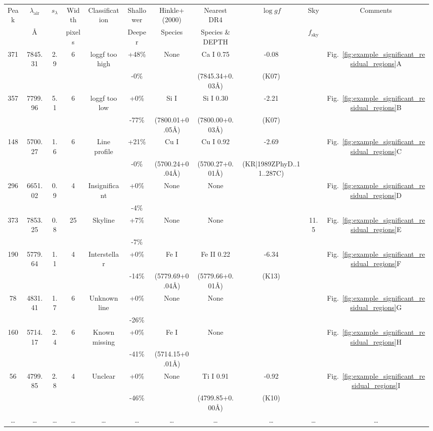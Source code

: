 \begin{tabular}{ccccccccccc}
\hline
Peak & $\lambda_\mathrm{air}$ & $s_\lambda$ & Width  & Classification & Shallower & Hinkle+(2000) & Nearest DR4 & $\log gf$ & Sky              & Comments \\
     & $\text{\AA}$           &             & pixels &                & Deeper    & Species       & Species \& \textsc{DEPTH} &  & $f_\mathrm{sky}$ &          \\
\hline
371 & 7845.31 & 2.9 & 6 & loggf too high & +48\% & None & Ca I 0.75 & -0.08 &  & Fig.~\ref{fig:example_significant_residual_regions}A \\
  &         &     &  &             & -0\% &  &  (7845.34+0.03Å) & (K07) &  \\
357 & 7799.96 & 5.1 & 6 & loggf too low & +0\% & Si I & Si I 0.30 & -2.21 &  & Fig.~\ref{fig:example_significant_residual_regions}B \\
  &         &     &  &             & -77\% & (7800.01+0.05Å) &  (7800.00+0.03Å) & (K07) &  \\
148 & 5700.27 & 1.6 & 6 & Line profile & +21\% & Cu I & Cu I 0.92 & -2.69 &  & Fig.~\ref{fig:example_significant_residual_regions}C \\
  &         &     &  &             & -0\% & (5700.24+0.04Å) &  (5700.27+0.01Å) & (KR|1989ZPhyD..11..287C) &  \\
296 & 6651.02 & 0.9 & 4 & Insignificant & +0\% & None & None &  &  & Fig.~\ref{fig:example_significant_residual_regions}D \\
  &         &     &  &             & -4\% &  &   &  &  &  \\
373 & 7853.25 & 0.8 & 25 & Skyline & +7\% & None & None &  & 11.5 & Fig.~\ref{fig:example_significant_residual_regions}E \\
  &         &     &  &             & -7\% &  &   &  &  &  \\
190 & 5779.64 & 1.1 & 4 & Interstellar & +0\% & Fe I & Fe II 0.22 & -6.34 &  & Fig.~\ref{fig:example_significant_residual_regions}F \\
  &         &     &  &             & -14\% & (5779.69+0.04Å) &  (5779.66+0.01Å) & (K13) &  \\
78 & 4831.41 & 1.7 & 6 & Unknown line & +0\% & None & None &  &  & Fig.~\ref{fig:example_significant_residual_regions}G \\
  &         &     &  &             & -26\% &  &   &  &  &  \\
160 & 5714.17 & 2.4 & 6 & Known missing & +0\% & Fe I & None &  &  & Fig.~\ref{fig:example_significant_residual_regions}H \\
  &         &     &  &             & -41\% & (5714.15+0.01Å) &   &  &  &  \\
56 & 4799.85 & 2.8 & 4 & Unclear & +0\% & None & Ti I 0.91 & -0.92 &  & Fig.~\ref{fig:example_significant_residual_regions}I \\
  &         &     &  &             & -46\% &  &  (4799.85+0.00Å) & (K10) &  \\
\dots & \dots & \dots & \dots & \dots & \dots & \dots & \dots & \dots & \dots & \dots \\
\hline
\end{tabular}
